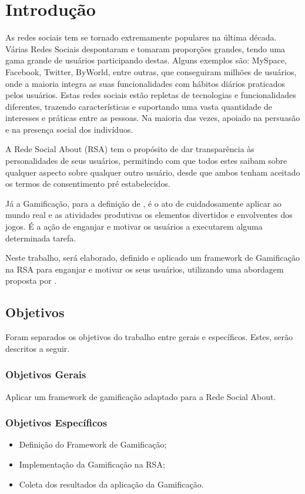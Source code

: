 \chapter[Introdução]{Introdução}
As redes sociais tem se tornado extremamente populares na última década.
Várias
Redes Sociais despontaram e tomaram proporções grandes, tendo uma gama grande
de usuários participando destas. Alguns exemplos são: MySpace, Facebook, Twitter,
ByWorld, entre outras, que conseguiram milhões de usuários, onde a maioria integra
as suas funcionalidades com hábitos diários praticados pelos usuários.
Estas redes sociais estão repletas de tecnologias e funcionalidades diferentes,
trazendo características e suportando uma vasta quantidade de interesses e práticas
entre as pessoas. Na maioria das vezes, apoiado na persuasão e na presença social
dos indivíduos.

A Rede Social About (RSA) tem o propósito de dar transparência às personalidades de seus usuários, permitindo com que todos
estes saibam sobre qualquer aspecto sobre qualquer outro usuário, desde que ambos tenham aceitado os
termos de consentimento pré estabelecidos.

Já a Gamificação, para a definição de \cite{chou2015actionable},  é o ato de cuidadosamente aplicar ao mundo
real e as atividades produtivas os elementos divertidos e envolventes dos jogos.
É a ação de enganjar e motivar os usuários a executarem alguma determinada
tarefa. 

Neste trabalho, será elaborado, definido e aplicado um framework de Gamificação na RSA 
para enganjar e motivar os seus usuários, utilizando uma abordagem proposta por \cite{chou2015actionable}.


\section{Objetivos}
Foram separados os objetivos do trabalho entre gerais e específicos. Estes, serão
descritos a seguir.
\subsection{Objetivos Gerais}
Aplicar um framework de  gamificação adaptado para a Rede Social About.
\subsection{Objetivos Específicos}
\begin{itemize}
    \item Definição do Framework de Gamificação;
    \item Implementação da Gamificação na RSA;
    \item Coleta dos resultados da aplicação da Gamificação.
\end{itemize}
